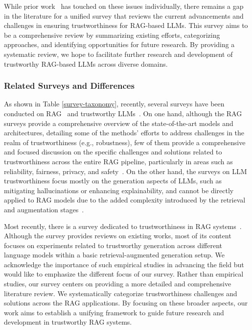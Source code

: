 While prior work~\cite{privacy_rag_2024, xue2024badrag, robust_rag_2024, doshi2017accountability, zhou2024trustworthiness} has touched on these issues individually, there remains a gap in the literature for a unified survey that reviews the current advancements and challenges in ensuring trustworthiness for RAG-based LLMs. This survey aims to be a comprehensive review by summarizing existing efforts, categorizing approaches, and identifying opportunities for future research. By providing a systematic review, we hope to facilitate further research and development of trustworthy RAG-based LLMs across diverse domains.



\subsubsection{Related Surveys and Differences}
As shown in Table \ref{survey-taxonomy}, recently, several surveys have been conducted on RAG~\cite{Gao2023Retrieval, fan2024survey} and trustworthy LLMs~\cite{trustworthy_llms_2024, huang2023surveysafetytrustworthinesslarge}. On one hand, although the RAG surveys provide a comprehensive overview of the state-of-the-art models and architectures, detailing some of the methods' efforts to address challenges in the realm of trustworthiness (e.g., robustness), few of them provide a comprehensive and focused discussion on the specific challenges and solutions related to trustworthiness across the entire RAG pipeline, particularly in areas such as reliability, fairness, privacy, and safety~\cite{Gao2023Retrieval, fan2024survey}. On the other hand, the surveys on LLM trustworthiness focus mostly on the generation aspects of LLMs, such as mitigating hallucinations or enhancing explainability, and cannot be directly applied to RAG models due to the added complexity introduced by the retrieval and augmentation stages~\cite{trustworthy_llms_2024}.

Most recently, there is a survey dedicated to trustworthiness in RAG systems~\cite{zhou2024trustworthiness}. Although the survey provides reviews on existing works, most of its content focuses on experiments related to trustworthy generation across different language models within a basic retrieval-augmented generation setup. We acknowledge the importance of such empirical studies in advancing the field but would like to emphasize the different focus of our survey. Rather than empirical studies, our survey centers on providing a more detailed and comprehensive literature review. We systematically categorize trustworthiness challenges and solutions across the RAG applications. By focusing on these broader aspects, our work aims to establish a unifying framework to guide future research and development in trustworthy RAG systems.


